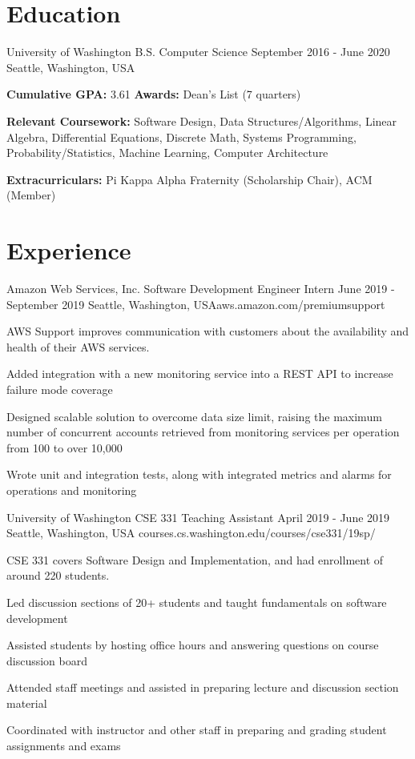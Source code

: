 \documentclass{resume}
\begin{document}
\maketitle

\section{Education}

\school
{University of Washington}
{B.S. Computer Science}
{September 2016 - June 2020}
{Seattle, Washington, USA}
{\textbf{Cumulative GPA:} 3.61 \blt \textbf{Awards:} Dean's List (7 quarters)

  \textbf{Relevant Coursework:} Software Design, Data Structures/Algorithms, 
  Linear Algebra, Differential Equations, Discrete Math, Systems Programming,
  Probability/Statistics, Machine Learning, Computer Architecture

  \textbf{Extracurriculars:} Pi Kappa Alpha Fraternity (Scholarship Chair), 
  ACM (Member)
}

\section{Experience}

\job
{Amazon Web Services, Inc.}
{Software Development Engineer Intern}
{June 2019 - September 2019}
{Seattle, Washington, USA}{aws.amazon.com/premiumsupport}
{
  AWS Support improves communication with customers about the availability 
  and health of their AWS services.
  \begin{overview}
    \item Added integration with a new monitoring service into a REST API to 
          increase failure mode coverage
    \item Designed scalable solution to overcome data size limit, raising the 
          maximum number of concurrent accounts retrieved from monitoring services 
          per operation from 100 to over 10,000
    \item Wrote unit and integration tests, along with integrated metrics and 
          alarms for operations and monitoring
  \end{overview}
}

\job
{University of Washington}
{CSE 331 Teaching Assistant}
{April 2019 - June 2019}
{Seattle, Washington, USA}
{courses.cs.washington.edu/courses/cse331/19sp/}
{
  CSE 331 covers Software Design and Implementation, and had enrollment of around 220 students.
  \begin{overview}
    \item Led discussion sections of 20+ students and taught fundamentals on
          software development
    \item Assisted students by hosting office hours and answering questions on 
          course discussion board
    \item Attended staff meetings and assisted in preparing lecture and 
          discussion section material
    \item Coordinated with instructor and other staff in preparing and grading 
          student assignments and exams
  \end{overview}
}
\end{document}
